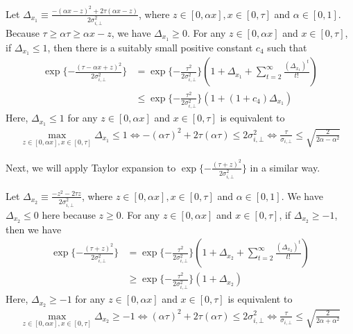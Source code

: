 Let $\Delta_{x_1} \equiv \frac{-(\alpha x-z)^2+2\tau(\alpha x-z)}{2\sigma^2_{i,\bot}}$, where $z \in [0,\alpha x], x \in [0,\tau]$ and $\alpha \in [0,1]$. Because $\tau \geq \alpha \tau \geq \alpha x -z$, we have $\Delta_{x_1} \geq 0$. For any $z \in [0,\alpha x]$ and $ x \in [0,\tau]$, if $\Delta_{x_1} \leq 1$, then there is a suitably small positive constant $c_4$ such that
\begin{equation} \label{eqn:Taylorexpan1}
\begin{split}
    \exp \{-\frac{(\tau - \alpha x + z)^2}{2\sigma^2_{i,\bot}} \}
    &= \exp \{-\frac{\tau^2}{2\sigma^2_{i,\bot}} \}\left( 1+\Delta_{x_1} + \sum^{\infty}_{t=2}\frac{(\Delta_{x_1})^t}{t !}  \right)   \\ 
    &\leq \exp \{-\frac{\tau^2}{2\sigma^2_{i,\bot}} \}\left( 1+(1+c_4)\Delta_{x_1} \right) 
\end{split}
\end{equation}
Here, $\Delta_{x_1} \leq 1$ for any $z \in [0,\alpha x]$ and $ x \in [0,\tau]$ is equivalent to
\begin{equation} \label{eqn:restrict1}
\begin{split}
    \max_{z \in [0,\alpha x],x \in [0,\tau]} \Delta_{x_1} \leq 1
    \Leftrightarrow -(\alpha \tau)^2+2\tau(\alpha \tau) \leq 2\sigma^2_{i,\bot}  
    \Leftrightarrow \frac{\tau}{\sigma_{i,\bot}} \leq \sqrt{\frac{2}{2\alpha - \alpha^2}}
\end{split}
\end{equation}

Next, we will apply Taylor expansion to $\exp \{-\frac{(\tau + z)^2}{2\sigma^2_{i,\bot}} \}$ in a similar way.

Let $\Delta_{x_2} \equiv \frac{-z^2-2\tau z}{2\sigma^2_{i,\bot}}$, where $z \in [0,\alpha x], x \in [0,\tau]$ and $\alpha \in [0,1]$. We have $\Delta_{x_2} \leq 0$ here because $z \geq 0$. For any $z \in [0,\alpha x]$ and $ x \in [0,\tau]$, if $\Delta_{x_2} \geq -1$, then we have
\begin{equation} \label{eqn:Taylorexpan2}
\begin{split}
    \exp \{-\frac{(\tau + z)^2}{2\sigma^2_{i,\bot}} \}
    &= \exp \{-\frac{\tau^2}{2\sigma^2_{i,\bot}} \}\left( 1+\Delta_{x_2} + \sum^{\infty}_{t=2}\frac{(\Delta_{x_2})^t}{t !}  \right)   \\ 
    &\geq \exp \{-\frac{\tau^2}{2\sigma^2_{i,\bot}} \}\left( 1+\Delta_{x_2} \right) 
\end{split}
\end{equation}
Here, $\Delta_{x_2} \geq -1$ for any $z \in [0,\alpha x]$ and $ x \in [0,\tau]$ is equivalent to
\begin{equation} \label{eqn:restrict2}
\begin{split}
    \max_{z \in [0,\alpha x],x \in [0,\tau]} \Delta_{x_2} \geq -1
    \Leftrightarrow (\alpha \tau)^2+2\tau(\alpha \tau) \leq 2\sigma^2_{i,\bot}  
    \Leftrightarrow \frac{\tau}{\sigma_{i,\bot}} \leq \sqrt{\frac{2}{2\alpha + \alpha^2}}
\end{split}
\end{equation}

